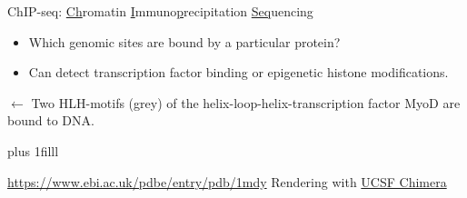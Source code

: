 \documentclass[10pt]{beamer}
\newcommand{\credit}[1]{{\vskip0pt plus 1filll \par \raggedleft \scriptsize \mdseries \color{mDarkBrown} #1 \par}}
\begin{document}
\begin{frame}{ChIP-seq: \underline{Ch}romatin \underline{I}mmuno\underline{p}recipitation \underline{Seq}uencing}
	\begin{minipage}{.46\linewidth}
		\begin{center}
			{}
		\end{center}
	\end{minipage}
	\begin{minipage}{.53\linewidth}
		\begin{itemize}
			\item Which genomic sites are bound by a particular protein?
			\item Can detect transcription factor binding or epigenetic histone modifications.
		\end{itemize}
		\vspace{2em}
		{\begin{flushleft}
				\scriptsize $\leftarrow$ Two HLH-motifs (grey) of the  helix-loop-helix-transcription factor MyoD are bound to DNA.\end{flushleft}}
	\end{minipage}%
	\credit{\begin{flushleft}
			\url{https://www.ebi.ac.uk/pdbe/entry/pdb/1mdy} \linebreak Rendering with \href{http://www.cgl.ucsf.edu/chimera}{UCSF Chimera} \end{flushleft}}
\end{frame}
\end{document}
